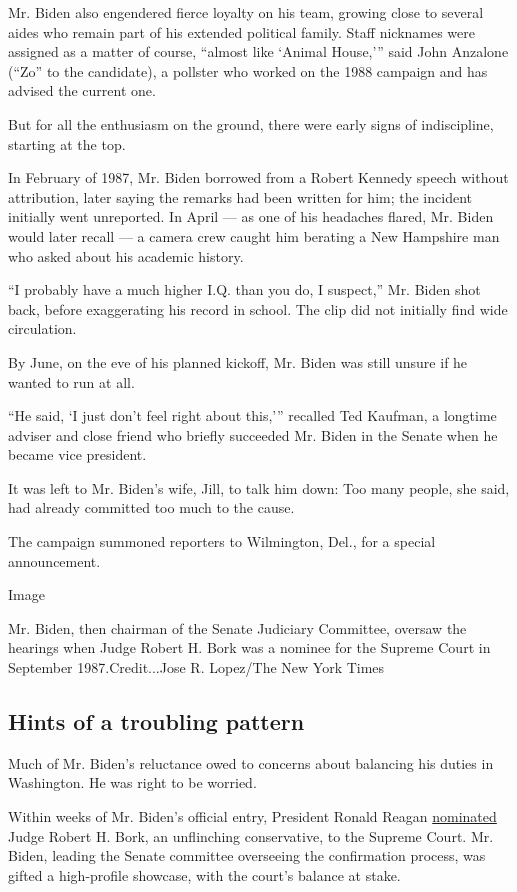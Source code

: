 Mr. Biden also engendered fierce loyalty on his team, growing close to
several aides who remain part of his extended political family. Staff
nicknames were assigned as a matter of course, ``almost like `Animal
House,''' said John Anzalone (``Zo'' to the candidate), a pollster who
worked on the 1988 campaign and has advised the current one.

But for all the enthusiasm on the ground, there were early signs of
indiscipline, starting at the top.

In February of 1987, Mr. Biden borrowed from a Robert Kennedy speech
without attribution, later saying the remarks had been written for him;
the incident initially went unreported. In April --- as one of his
headaches flared, Mr. Biden would later recall --- a camera crew caught
him berating a New Hampshire man who asked about his academic history.

``I probably have a much higher I.Q. than you do, I suspect,'' Mr. Biden
shot back, before exaggerating his record in school. The clip did not
initially find wide circulation.

By June, on the eve of his planned kickoff, Mr. Biden was still unsure
if he wanted to run at all.

``He said, `I just don't feel right about this,''' recalled Ted Kaufman,
a longtime adviser and close friend who briefly succeeded Mr. Biden in
the Senate when he became vice president.

It was left to Mr. Biden's wife, Jill, to talk him down: Too many
people, she said, had already committed too much to the cause.

The campaign summoned reporters to Wilmington, Del., for a special
announcement.

Image

Mr. Biden, then chairman of the Senate Judiciary Committee, oversaw the
hearings when Judge Robert H. Bork was a nominee for the Supreme Court
in September 1987.Credit...Jose R. Lopez/The New York Times

\hypertarget{hints-of-a-troubling-pattern}{%
\subsection{Hints of a troubling
pattern}\label{hints-of-a-troubling-pattern}}

Much of Mr. Biden's reluctance owed to concerns about balancing his
duties in Washington. He was right to be worried.

Within weeks of Mr. Biden's official entry, President Ronald Reagan
\href{https://www.nytimes.com/1987/07/02/us/bork-picked-for-high-court-reagan-cites-his-restraint-confirmation-fight-looms.html}{nominated}
Judge Robert H. Bork, an unflinching conservative, to the Supreme Court.
Mr. Biden, leading the Senate committee overseeing the confirmation
process, was gifted a high-profile showcase, with the court's balance at
stake.

